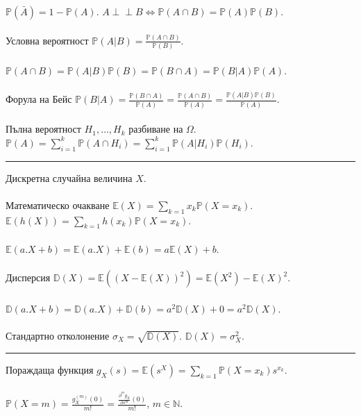 \documentclass[10pt, a4paper]{article}
\newcommand{\prob}{\mathbb{P}}
\newcommand{\expect}{\mathbb{E}}
\newcommand{\disp}{\mathbb{D}}
\newcommand{\indep}{\perp \!\!\! \perp}
\begin{document}
\(\prob(\bar{A}) = 1 - \prob(A)\). \quad \(A \indep B \iff \prob(A \cap B) = \prob(A)\prob(B)\).
\\
\\
Условна вероятност
\(\prob(A | B) = \displaystyle\frac{\prob(A \cap B)}{\prob(B)}\).
\\
\\
\(\prob(A \cap B) = \prob(A | B)\prob(B) = \prob(B \cap A) = \prob(B | A)\prob(A)\).
\\
\\
Форула на Бейс
\(\prob(B | A)
= \displaystyle\frac{\prob(B \cap A)}{\prob(A)}
= \displaystyle\frac{\prob(A \cap B)}{\prob(A)}
=\displaystyle\frac{\prob(A | B)\prob(B)}{\prob(A)}\).
\\
\\
Пълна вероятност \(H_1, \dots, H_k\) разбиване на \(\Omega\).
\(\prob(A)
= \displaystyle\sum_{i = 1}^k \prob(A \cap H_i)
= \displaystyle\sum_{i = 1}^k \prob(A | H_i)\prob(H_i)\).
\\
\hrule
\vspace*{3mm}
Дискретна случайна величина \(X\).
\\
\\
Математическо очакване \(\expect(X) = \displaystyle\sum_{k = 1} x_k \prob(X = x_k)\).
\(\expect(h(X)) = \displaystyle\sum_{k = 1} h(x_k) \prob(X = x_k)\).
\\
\\
\(\expect(a.X + b) = \expect(a.X) + \expect(b) = a\expect(X) + b\).
\\
\\
Дисперсия \(\disp(X) = \expect((X - \expect(X))^2) = \expect(X^2) - \expect(X)^2\).
\\
\\
\(\disp(a.X + b) = \disp(a.X) + \disp(b) = a^2\disp(X) + 0 = a^2\disp(X)\).
\\
\\
Стандартно отколонение \(\sigma_X = \sqrt{\disp(X)}\). \quad \(\disp(X) = \sigma_X^2\).
\\
\hrule
\vspace*{3mm}
Пораждаща функция \(g_X(s) = \expect(s^X) = \displaystyle\sum_{k = 1} \prob(X = x_k) s^{x_k} \).
\\
\vspace*{1mm}
\\
\(\prob(X = m) = \displaystyle\frac{g_X^{(m)}(0)}{m!}
= \displaystyle\frac{\displaystyle\frac{\partial^m g_X}{\partial s^m}(0)}{m!}\),
\quad \(m \in \mathbb{N}\).
\\
\\
\end{document}
